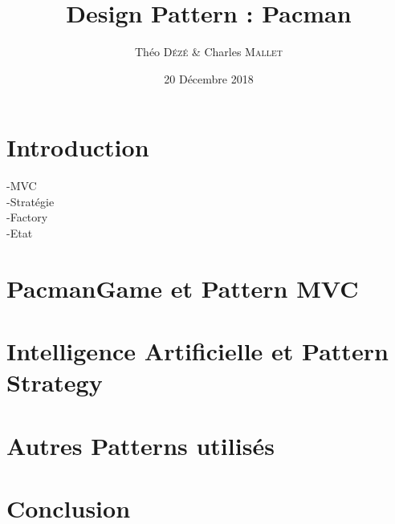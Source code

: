\documentclass[a4paper, 11pt]{article}
\begin{document}
\title{Design Pattern : Pacman}
\author{Théo \textsc{Dézé}  \& Charles \textsc {Mallet}}
\date{20 Décembre 2018} 

\maketitle

\tableofcontents

\pagebreak

\part{Introduction}

-MVC \\
-Stratégie \\
-Factory \\
-Etat \\

\part{PacmanGame et Pattern MVC}


\part{Intelligence Artificielle et Pattern Strategy}

\part{Autres Patterns utilisés}


\part{Conclusion}
\end{document}
